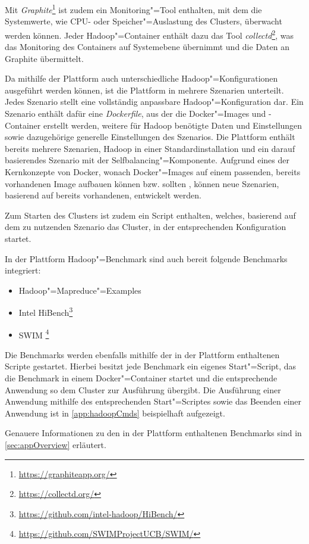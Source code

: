 Mit \emph{Graphite}\footnote{\url{https://graphiteapp.org/}} ist zudem ein Monitoring"=Tool enthalten, mit dem die Systemwerte, wie CPU- oder Speicher"=Auslastung des Clusters, überwacht werden können.
Jeder Hadoop"=Container enthält dazu das Tool \emph{collectd}\footnote{\url{https://collectd.org/}}, was das Monitoring des Containers auf Systemebene übernimmt und die Daten an Graphite übermittelt.

Da mithilfe der Plattform auch unterschiedliche Hadoop"=Konfigurationen ausgeführt werden können, ist die Plattform in mehrere Szenarien unterteilt.
Jedes Szenario stellt eine vollständig anpassbare Hadoop"=Konfiguration dar.
Ein Szenario enthält dafür eine \emph{Dockerfile}, aus der die Docker"=Images und -Container erstellt werden, weitere für Hadoop benötigte Daten und Einstellungen sowie dazugehörige generelle Einstellungen des Szenarios.
Die Plattform enthält bereits mehrere Szenarien, \uA Hadoop in einer Standardinstallation und ein darauf basierendes Szenario mit der Selfbalancing"=Komponente.
Aufgrund eines der Kernkonzepte von Docker, wonach Docker"=Images auf einem passenden, bereits vorhandenen Image aufbauen können bzw. sollten \cite{DockerdevBestPractice}, können neue Szenarien, basierend auf bereits vorhandenen, entwickelt werden.

Zum Starten des Clusters ist zudem ein Script enthalten, welches, basierend auf dem zu nutzenden Szenario das Cluster, in der entsprechenden Konfiguration startet.

In der Plattform Hadoop"=Benchmark sind auch bereit folgende Benchmarks integriert:

\begin{itemize}
    \item Hadoop"=Mapreduce"=Examples
    \item Intel HiBench\footnote{\url{https://github.com/intel-hadoop/HiBench/}}
    \item \gls{SWIM} \footnote{\url{https://github.com/SWIMProjectUCB/SWIM/}}
\end{itemize}

Die Benchmarks werden ebenfalls mithilfe der in der Plattform enthaltenen Scripte gestartet.
Hierbei besitzt jede Benchmark ein eigenes Start"=Script, das die Benchmark in einem Docker"=Container startet und die entsprechende Anwendung so dem Cluster zur Ausführung übergibt.
Die Ausführung einer Anwendung mithilfe des entsprechenden Start"=Scriptes sowie das Beenden einer Anwendung ist in \cref{app:hadoopCmds} beispielhaft aufgezeigt.

Genauere Informationen zu den in der Plattform enthaltenen Benchmarks sind in \cref{sec:appOverview} erläutert.
